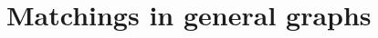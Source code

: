 \documentclass[main]{subfiles}
\begin{document}

\section{Matchings in general graphs}
\end{document}

